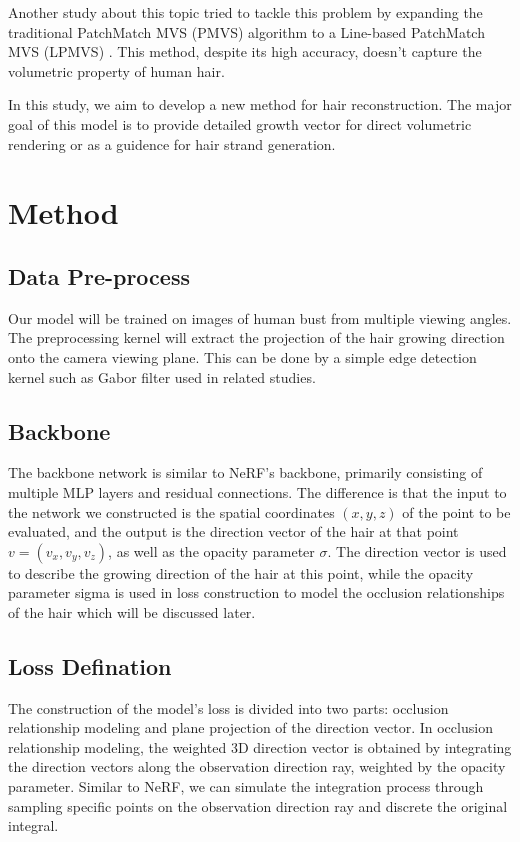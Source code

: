 \documentclass[12pt]{article}
\begin{document}
  Another study about this topic tried to tackle this problem by expanding the traditional PatchMatch MVS (PMVS) algorithm to a Line-based PatchMatch MVS (LPMVS) \cite{nam_strand-accurate_nodate}. This method, despite its high accuracy, doesn't capture the volumetric property of human hair.

  In this study, we aim to develop a new method for hair reconstruction. The major goal of this model is to provide detailed growth vector for direct volumetric rendering or as a guidence for hair strand generation.

  \section{Method}
    \subsection{Data Pre-process}

    Our model will be trained on images of human bust from multiple viewing angles. The preprocessing kernel will extract the projection of the hair growing direction onto the camera viewing plane. This can be done by a simple edge detection kernel such as Gabor filter used in related studies.
    
    \subsection{Backbone}
    
    The backbone network is similar to NeRF's backbone, primarily consisting of multiple MLP layers and residual connections. The difference is that the input to the network we constructed is the spatial coordinates $(x, y, z)$ of the point to be evaluated, and the output is the direction vector of the hair at that point $v = (v_x, v_y, v_z)$, as well as the opacity parameter $\sigma$. The direction vector is used to describe the growing direction of the hair at this point, while the opacity parameter sigma is used in loss construction to model the occlusion relationships of the hair which will be discussed later.
    
    \subsection{Loss Defination}
    The construction of the model's loss is divided into two parts: occlusion relationship modeling and plane projection of the direction vector. In occlusion relationship modeling, the weighted 3D direction vector is obtained by integrating the direction vectors along the observation direction ray, weighted by the opacity parameter. Similar to NeRF, we can simulate the integration process through sampling specific points on the observation direction ray and discrete the original integral.
\end{document}
